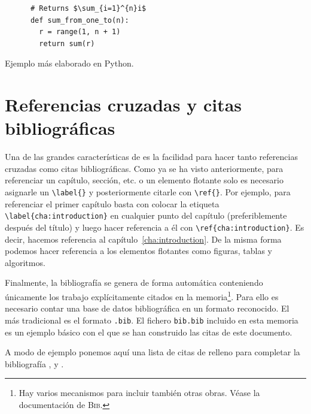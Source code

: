 \documentclass{DeustoFDP}
\begin{document}
\begin{listing}\centering
  \begin{minipage}{.4\textwidth}
    \begin{verbatim}
      # Returns $\sum_{i=1}^{n}i$
      def sum_from_one_to(n):
        r = range(1, n + 1)
        return sum(r)
    \end{verbatim}
  \end{minipage}
  \caption{Ejemplo m\'as elaborado en Python.}\label{lst:python}
\end{listing}

\section{Referencias cruzadas y citas bibliogr\'aficas}

Una de las grandes caracter\'isticas de  es la facilidad para
hacer tanto referencias cruzadas como citas bibliogr\'aficas. Como ya se ha
visto anteriormente, para referenciar un cap\'itulo, secci\'on, etc. o
un elemento flotante solo es necesario asignarle un \verb+\label{}+ y
posteriormente citarle con \verb+\ref{}+. Por ejemplo, para referenciar
el primer cap\'itulo basta con colocar la etiqueta
\verb+\label{cha:introduction}+ en cualquier punto del cap\'itulo
(preferiblemente despu\'es del t\'itulo) y luego hacer referencia a \'el
con \verb+\ref{cha:introduction}+. Es decir, hacemos referencia al
cap\'itulo~\ref{cha:introduction}. De la misma forma podemos hacer referencia a
los elementos flotantes como figuras, tablas y algoritmos.

Finalmente, la bibliograf\'ia se genera de forma autom\'atica conteniendo
\'unicamente los trabajo expl\'icitamente citados en la
memoria\footnote{Hay varios mecanismos para incluir tambi\'en otras obras.
V\'ease la documentaci\'on de \textsc{Bib}.}. Para ello es necesario
contar una base de datos bibliogr\'afica en un formato reconocido. El m\'as
tradicional es el formato \texttt{.bib}. El fichero \texttt{bib.bib}
incluido en esta memoria es un ejemplo b\'asico con el que se han construido
las citas de este documento.

A modo de ejemplo ponemos aqu\'i una lista de citas de relleno para completar
la bibliograf\'ia \cite{article,conference,book}, \cite{phd} y \cite{master}.

\printbibliography[heading=bibintoc]

\appendix

\backmatter
\end{document}
